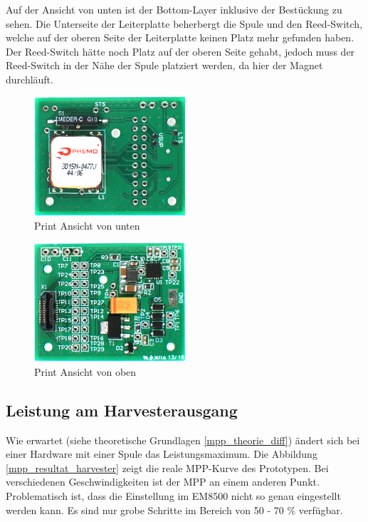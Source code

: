 Auf der Ansicht von unten ist der Bottom-Layer inklusive der Bestückung zu sehen. Die Unterseite der Leiterplatte beherbergt die Spule und den Reed-Switch, welche auf der oberen Seite der Leiterplatte keinen Platz mehr gefunden haben. Der Reed-Switch hätte noch Platz auf der oberen Seite gehabt, jedoch muss der Reed-Switch in der Nähe der Spule platziert werden, da hier der Magnet durchläuft.

\begin{figure}[ht]
    \includegraphics[width=0.5\textwidth]{4Resultate/imag/print_rueckseite.png} 
    \caption{Print Ansicht von unten}
    \label{print_rueckseite}
\end{figure}

\begin{figure}[ht]
    \includegraphics[width=0.5\textwidth]{4Resultate/imag/print_vorne.png} 
    \caption{Print Ansicht von oben}
    \label{print_vorne}
\end{figure}

\subsection{Leistung am Harvesterausgang}

Wie erwartet (siehe theoretische Grundlagen \ref{mpp_theorie_diff}) ändert sich bei einer Hardware mit einer Spule das Leistungsmaximum. Die Abbildung \ref{mpp_resultat_harvester} zeigt die reale MPP-Kurve des Prototypen. Bei verschiedenen Geschwindigkeiten ist der MPP an einem anderen Punkt. Problematisch ist, dass die Einstellung im EM8500 nicht so genau eingestellt werden kann. Es sind nur grobe Schritte im Bereich von 50 - 70 \% verfügbar. 

